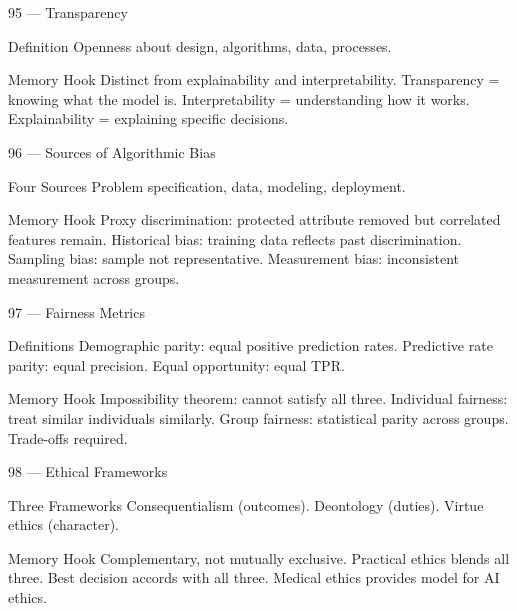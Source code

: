 \documentclass[aspectratio=169,8pt]{beamer}
\begin{document}
	\begin{frame}{95 --- Transparency}
		\begin{block}{Definition}
			Openness about design, algorithms, data, processes.
		\end{block}
		\begin{block}{Memory Hook}
			Distinct from explainability and interpretability. Transparency = knowing what the model is. Interpretability = understanding how it works. Explainability = explaining specific decisions.
		\end{block}
	\end{frame}
	
	\begin{frame}{96 --- Sources of Algorithmic Bias}
		\begin{block}{Four Sources}
			Problem specification, data, modeling, deployment.
		\end{block}
		\begin{block}{Memory Hook}
			Proxy discrimination: protected attribute removed but correlated features remain. Historical bias: training data reflects past discrimination. Sampling bias: sample not representative. Measurement bias: inconsistent measurement across groups.
		\end{block}
	\end{frame}
	
	\begin{frame}{97 --- Fairness Metrics}
		\begin{block}{Definitions}
			Demographic parity: equal positive prediction rates. Predictive rate parity: equal precision. Equal opportunity: equal TPR.
		\end{block}
		\begin{block}{Memory Hook}
			Impossibility theorem: cannot satisfy all three. Individual fairness: treat similar individuals similarly. Group fairness: statistical parity across groups. Trade-offs required.
		\end{block}
	\end{frame}
	
	\begin{frame}{98 --- Ethical Frameworks}
		\begin{block}{Three Frameworks}
			Consequentialism (outcomes). Deontology (duties). Virtue ethics (character).
		\end{block}
		\begin{block}{Memory Hook}
			Complementary, not mutually exclusive. Practical ethics blends all three. Best decision accords with all three. Medical ethics provides model for AI ethics.
		\end{block}
	\end{frame}
	
\end{document}
